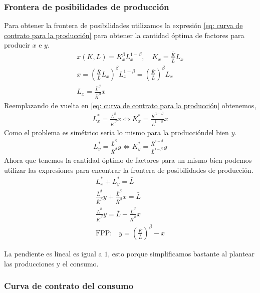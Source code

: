 \subsubsection*{Frontera de posibilidades de producción}
Para obtener la frontera de posibilidades utilizamos la expresión \ref{eq: curva de contrato para la producción} para obtener la cantidad óptima de factores para producir $x$ e $y$. 
\begin{align*}
    x(K,L) = K_x^\beta L_x^{1-\beta}, \quad K_x = \frac{\bar{K}}{\bar{L}}L_x \\
    x = \left( \frac{\bar{K}}{\bar{L}}L_x \right)^\beta L_x^{1-\beta} = \left( \frac{\bar{K}}{\bar{L}} \right)^\beta L_x \\
    L_x =  \frac{\bar{L}^\beta}{\bar{K}^\beta}  x
\end{align*}
Reemplazando de vuelta en \ref{eq: curva de contrato para la producción} obtenemos,
\begin{align}
    L^*_x =  \frac{\bar{L}^\beta}{\bar{K}^\beta}  x \Longleftrightarrow K^*_x = \frac{\bar{K}^{1-\beta}}{\bar{L}^{1-\beta}}  x
\end{align}
Como el problema es simétrico sería lo mismo para la produccióndel bien $y$. 
\begin{align*}
    L^*_y =  \frac{\bar{L}^\beta}{\bar{K}^\beta} y \Longleftrightarrow K^*_y = \frac{\bar{K}^{1-\beta}}{\bar{L}^{1-\beta}}  y
\end{align*}
Ahora que tenemos la cantidad óptimo de factores para un mismo bien podemos utilizar las expresiones para encontrar la frontera de posibilidades de producción. 
\begin{align*}
    L^*_x + L_y^* = \bar{L} \\
    \frac{\bar{L}^\beta}{\bar{K}^\beta}y + \frac{\bar{L}^\beta}{\bar{K}^\beta}x = \bar{L} \\
    \frac{\bar{L}^\beta}{\bar{K}^\beta}y = \bar{L} -  \frac{\bar{L}^\beta}{\bar{K}^\beta}x \\
    \text{FPP:} \quad y = \left( \frac{\bar{K}}{\bar{L}} \right)^\beta - x 
\end{align*}

La pendiente es lineal es igual a $1$, esto porque simplificamos bastante al plantear las producciones y el consumo.

\subsubsection*{Curva de contrato del consumo}

